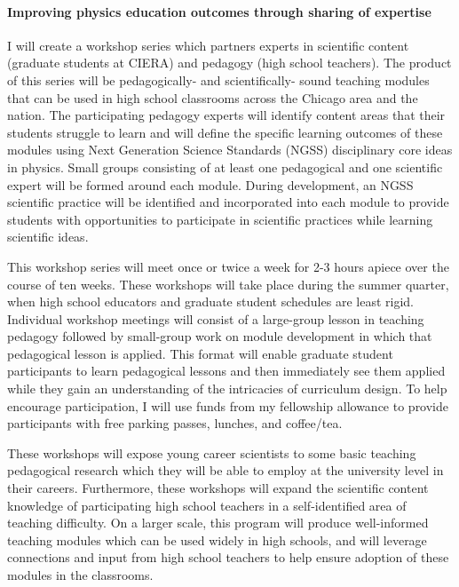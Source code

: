 \documentclass[11pt, preprint]{aastex}
\begin{document}
\vspace{-0.5cm}
\paragraph{Improving physics education outcomes through sharing of expertise}
I will create a workshop series which partners experts in scientific content (graduate students at CIERA) and pedagogy (high school teachers).
The product of this series will be pedagogically- and scientifically- sound teaching modules that can be used in high school classrooms across the Chicago area and the nation.
The participating pedagogy experts will identify content areas that their students struggle to learn and will define the specific learning outcomes of these modules using Next Generation Science Standards (NGSS) disciplinary core ideas in physics.
Small groups consisting of at least one pedagogical and one scientific expert will be formed around each module.
During development, an NGSS scientific practice will be identified and incorporated into each module to provide students with opportunities to participate in scientific practices while learning scientific ideas.

This workshop series will meet once or twice a week for 2-3 hours apiece over the course of ten weeks.
These workshops will take place during the summer quarter, when high school educators and graduate student schedules are least rigid.
Individual workshop meetings will consist of a large-group lesson in teaching pedagogy followed by small-group work on module development in which that pedagogical lesson is applied.
This format will enable graduate student participants to learn pedagogical lessons and then immediately see them applied while they gain an understanding of the intricacies of curriculum design.
To help encourage participation, I will use funds from my fellowship allowance to provide participants with free parking passes, lunches, and coffee/tea.

These workshops will expose young career scientists to some basic teaching pedagogical research which they will be able to employ at the university level in their careers.
Furthermore, these workshops will expand the scientific content knowledge of participating high school teachers in a self-identified area of teaching difficulty.
On a larger scale, this program will produce well-informed teaching modules which can be used widely in high schools, and will leverage connections and input from high school teachers to help ensure adoption of these modules in the classrooms.
\end{document}

